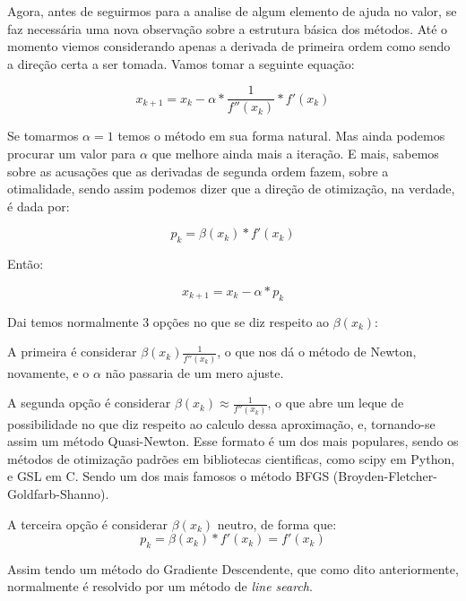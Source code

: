 Agora, antes de seguirmos para a analise de algum elemento de ajuda no valor, se
faz necessária uma nova observação sobre a estrutura básica dos métodos. Até o
momento viemos considerando apenas a derivada de primeira ordem como sendo a
direção certa a ser tomada. Vamos tomar a seguinte equação:

\begin{equation}
    x_{k+1} = x_{k} - \alpha * \frac{1}{f''(x_k)} * f'(x_k)
\end{equation}

Se tomarmos \(\alpha = 1\) temos o método em sua forma natural. Mas ainda
podemos procurar um valor para \(\alpha\) que melhore ainda mais a iteração.
E mais, sabemos sobre as acusações que as derivadas de segunda ordem fazem,
sobre a otimalidade, sendo assim podemos dizer que a direção de otimização,
na verdade, é dada por:

\begin{equation}
    p_k = \beta(x_k) * f'(x_k)
\end{equation}

Então:

\begin{equation}
    x_{k+1} = x_{k} - \alpha * p_{k}
\end{equation}


Dai temos normalmente 3 opções no que se diz respeito ao \(\beta(x_k)\):

A primeira é considerar \(\beta(x_k) \frac{1}{f''(x_k)}\), o que nos dá
o método de Newton, novamente, e o \(\alpha\) não passaria de um mero ajuste.

A segunda opção é considerar \(\beta(x_k) \approx \frac{1}{f''(x_k)}\), o que
abre um leque de possibilidade no que diz respeito ao calculo dessa aproximação,
e, tornando-se assim um método Quasi-Newton. Esse formato é um dos mais
populares, sendo os métodos de otimização padrões em bibliotecas cientificas,
como scipy em Python, e GSL em C. Sendo um dos mais famosos o método BFGS
(Broyden-Fletcher-Goldfarb-Shanno).


A terceira opção é considerar \(\beta(x_k) \) neutro, de forma que:
\begin{equation}
    p_k = \beta(x_k) * f'(x_k) = f'(x_k)
\end{equation}

Assim tendo um método do Gradiente Descendente, que como dito anteriormente,
normalmente é resolvido por um método de \textit{line search}.






